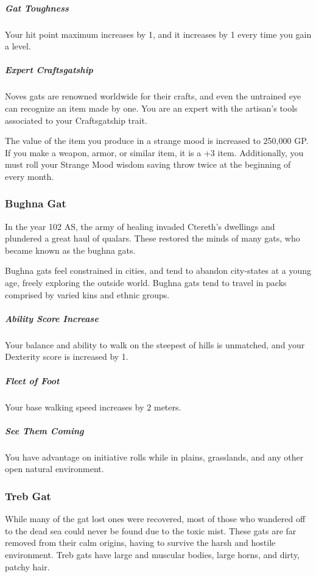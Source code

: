     \subparagraph{Gat Toughness} Your hit point maximum increases by 1, and it increases by 1 every time you gain a level.

    \subparagraph{Expert Craftsgatship} Noves gats are renowned worldwide for their crafts, and even the untrained eye can recognize an item made by one.
    You are an expert with the artisan's tools associated to your Craftsgatship trait.

    The value of the item you produce in a strange mood is increased to 250,000 GP.
    If you make a weapon, armor, or similar item, it is a +3 item.
    Additionally, you must roll your Strange Mood wisdom saving throw twice at the beginning of every month.

\subsubsection{Bughna Gat}
    In the year 102 AS, the army of healing invaded Ctereth's dwellings and plundered a great haul of qualars.
    These restored the minds of many gats, who became known as the bughna gats.

    Bughna gats feel constrained in cities, and tend to abandon city-states at a young age, freely exploring the outside world.
    Bughna gats tend to travel in packs comprised by varied kins and ethnic groups.

    \subparagraph{Ability Score Increase} Your balance and ability to walk on the steepest of hills is unmatched, and your Dexterity score is increased by 1.

    \subparagraph{Fleet of Foot} Your base walking speed increases by 2 meters.

    \subparagraph{See Them Coming} You have advantage on initiative rolls while in plains, grasslands, and any other open natural environment.

\subsubsection{Treb Gat}
    While many of the gat lost ones were recovered, most of those who wandered off to the dead sea could never be found due to the toxic mist.
    These gats are far removed from their calm origins, having to survive the harsh and hostile environment.
    Treb gats have large and muscular bodies, large horns, and dirty, patchy hair.

